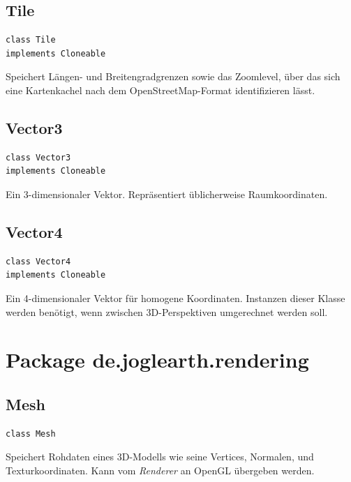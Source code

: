 \documentclass[10pt]{scrreprt}
\begin{document}
\vspace{5mm}
\subsection*{Tile}
\begin{lstlisting}
class Tile 
implements Cloneable
\end{lstlisting}
Speichert Längen- und Breitengradgrenzen sowie das Zoomlevel, über das sich eine Kartenkachel nach dem OpenStreetMap-Format identifizieren lässt.\\

\vspace{5mm}
\subsection*{Vector3}
\begin{lstlisting}
class Vector3
implements Cloneable
\end{lstlisting}
Ein 3-dimensionaler Vektor. Repräsentiert üblicherweise Raumkoordinaten.\\

\vspace{5mm}
\subsection*{Vector4}
\begin{lstlisting}
class Vector4
implements Cloneable
\end{lstlisting}
Ein 4-dimensionaler Vektor für homogene Koordinaten. Instanzen dieser Klasse werden benötigt, wenn zwischen 3D-Perspektiven umgerechnet werden soll.\\





\vspace{5mm}
\section{Package de.joglearth.rendering}
\subsection*{Mesh}
\begin{lstlisting}
class Mesh
\end{lstlisting}
Speichert Rohdaten eines 3D-Modells wie seine Vertices, Normalen, und Texturkoordinaten. Kann vom \textit{Renderer} an OpenGL übergeben werden.\\
\end{document}
